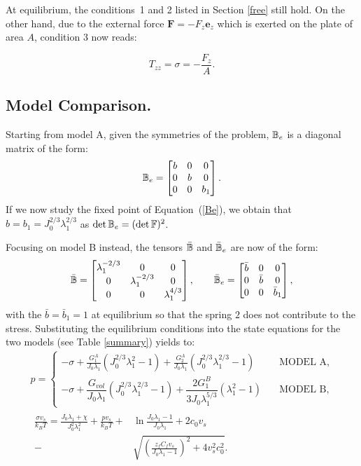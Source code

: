 At equilibrium, the conditions~1 and 2 listed in Section \ref{free} still hold. On the other hand, due to the external force $\mathbf{F}= -F_z \mathbf{e}_z$ which is exerted on the plate of area $A$, condition 3 now reads:

\begin{equation}
T_{zz}=\sigma = -\frac{F_z}{A}.
\end{equation} 

\subsection{Model Comparison.}
\label{data}
Starting from model A, given the symmetries of the problem, $\mathbb{B}_e$ is a diagonal matrix of the form:
\begin{equation}
\mathbb{B}_e=\begin{bmatrix}
b &0&0\\
0&b&0\\
0&0& b_1
\end{bmatrix}. 
\end{equation}
If we now study the fixed point of Equation~(\ref{Be}), we obtain that $b=b_1=J_0^{2/3}\lambda_1^{2/3}$ as $\det \mathbb{B}_e= (\det \mathbb{F})^2$.

Focusing on model B instead, the tensors $\bar{\mathbb{B}}$ and $\bar{\mathbb{B}}_e$ are now of the form:
\begin{equation}
\bar{\mathbb{B}}=\begin{bmatrix}
\lambda_1^{-2/3} &0&0\\
0&\lambda_1^{-2/3}&0\\
0&0& \lambda_1^{4/3}
\end{bmatrix}, \qquad
\bar{\mathbb{B}}_e=\begin{bmatrix}
\bar{b} &0&0\\
0&\bar{b}&0\\
0&0& \bar{b}_1
\end{bmatrix},
\end{equation}
with the $\bar{b}=\bar{b}_1=1$ at equilibrium so that the spring $2$ does not contribute to the stress. Substituting the equilibrium conditions into the state equations for the two models (see Table \ref{summary}) yields to:
\begin{gather}
p = \begin{cases}
\displaystyle
-\sigma + \frac{G^A_1}{J_0\lambda_1} (J^{2/3}_0\lambda_1^2-1)+\frac{G^A_2}{J_0\lambda_1} (J_0^{2/3} \lambda_1^{2/3}-1) &\quad \text{MODEL A}, \\[10pt]
-\sigma + \dfrac{G_{vol}}{J_0\lambda_1}(J_0^{2/3}\lambda_1^{2/3}-1)+\dfrac{2G^B_1}{3J_0\lambda_1^{5/3}} (\lambda_1^2-1) &\quad \text{MODEL B},
\end{cases}\\[10pt]
\begin{aligned}
\frac{\sigma v_s}{k_B T}=\frac{J_0\lambda_1+\chi}{J_0^2\lambda^2_1}+\frac{pv_s}{k_B T}+&\ln \frac{J_0\lambda_1-1}{J_0\lambda_1} +2c_0v_s\\
-\ &\sqrt{\left(\frac{z_fC_fv_s}{J_0\lambda_1-1}\right)^2+4v_s^2c^2_0}.
\end{aligned}\label{compA}
\end{gather}

